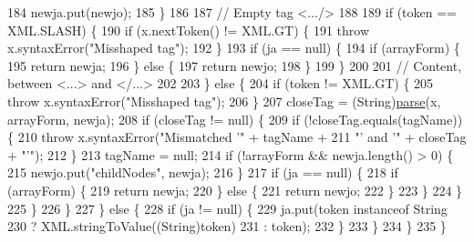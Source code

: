 \begin{DoxyCode}
184                         newja.put(newjo);
185                     \}
186 
187 \textcolor{comment}{// Empty tag <.../>}
188 
189                     \textcolor{keywordflow}{if} (token == XML.SLASH) \{
190                         \textcolor{keywordflow}{if} (x.nextToken() != XML.GT) \{
191                             \textcolor{keywordflow}{throw} x.syntaxError(\textcolor{stringliteral}{"Misshaped tag"});
192                         \}
193                         \textcolor{keywordflow}{if} (ja == null) \{
194                             \textcolor{keywordflow}{if} (arrayForm) \{
195                                 \textcolor{keywordflow}{return} newja;
196                             \} \textcolor{keywordflow}{else} \{
197                                 \textcolor{keywordflow}{return} newjo;
198                             \}
199                         \}
200 
201 \textcolor{comment}{// Content, between <...> and </...>}
202 
203                     \} \textcolor{keywordflow}{else} \{
204                         \textcolor{keywordflow}{if} (token != XML.GT) \{
205                             \textcolor{keywordflow}{throw} x.syntaxError(\textcolor{stringliteral}{"Misshaped tag"});
206                         \}
207                         closeTag = (String)\hyperlink{classorg_1_1json_1_1_j_s_o_n_m_l_a3c36aa36d0d65f7d3f5aef426750faec}{parse}(x, arrayForm, newja);
208                         \textcolor{keywordflow}{if} (closeTag != null) \{
209                             \textcolor{keywordflow}{if} (!closeTag.equals(tagName)) \{
210                                 \textcolor{keywordflow}{throw} x.syntaxError(\textcolor{stringliteral}{"Mismatched '"} + tagName +
211                                         \textcolor{stringliteral}{"' and '"} + closeTag + \textcolor{stringliteral}{"'"});
212                             \}
213                             tagName = null;
214                             \textcolor{keywordflow}{if} (!arrayForm && newja.length() > 0) \{
215                                 newjo.put(\textcolor{stringliteral}{"childNodes"}, newja);
216                             \}
217                             \textcolor{keywordflow}{if} (ja == null) \{
218                                 \textcolor{keywordflow}{if} (arrayForm) \{
219                                     \textcolor{keywordflow}{return} newja;
220                                 \} \textcolor{keywordflow}{else} \{
221                                     \textcolor{keywordflow}{return} newjo;
222                                 \}
223                             \}
224                         \}
225                     \}
226                 \}
227             \} \textcolor{keywordflow}{else} \{
228                 \textcolor{keywordflow}{if} (ja != null) \{
229                     ja.put(token instanceof String
230                         ? XML.stringToValue((String)token)
231                         : token);
232                 \}
233             \}
234         \}
235     \}
\end{DoxyCode}

